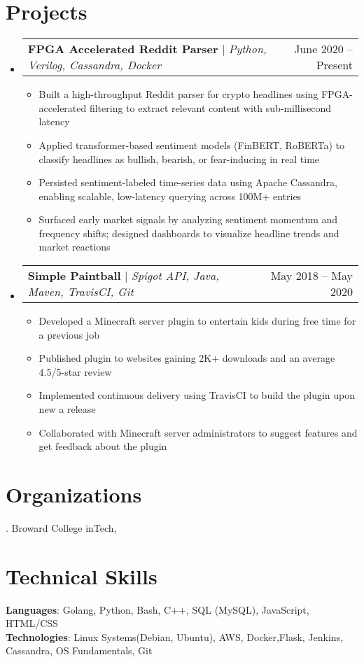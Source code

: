 \documentclass[letterpaper,11pt]{article}
\makeatletter
\newcommand{\resumeItem}[1]{
  \item\small{
    {#1 \vspace{-2pt}}
  }
}
\newcommand{\resumeProjectHeading}[2]{
    \item
    \begin{tabular*}{0.97\textwidth}{l@{\extracolsep{\fill}}r}
      \small#1 & #2 \\
    \end{tabular*}\vspace{-7pt}
}
\newcommand{\resumeSubHeadingListStart}{\begin{itemize}[leftmargin=0.15in, label={}]}
\newcommand{\resumeSubHeadingListEnd}{\end{itemize}}
\newcommand{\resumeItemListStart}{\begin{itemize}}
\newcommand{\resumeItemListEnd}{\end{itemize}\vspace{-5pt}}
\makeatother
\begin{document}
\section{Projects}
    \resumeSubHeadingListStart
\resumeProjectHeading
  {\textbf{FPGA Accelerated Reddit Parser} $|$ \emph{Python, Verilog, Cassandra, Docker}}{June 2020 -- Present}
  \resumeItemListStart
    \resumeItem{Built a high-throughput Reddit parser for crypto headlines using FPGA-accelerated filtering to extract relevant content with sub-millisecond latency}
    \resumeItem{Applied transformer-based sentiment models (FinBERT, RoBERTa) to classify headlines as bullish, bearish, or fear-inducing in real time}
    \resumeItem{Persisted sentiment-labeled time-series data using Apache Cassandra, enabling scalable, low-latency querying across 100M+ entries}
    \resumeItem{Surfaced early market signals by analyzing sentiment momentum and frequency shifts; designed dashboards to visualize headline trends and market reactions}
  \resumeItemListEnd
      \resumeProjectHeading
          {\textbf{Simple Paintball} $|$ \emph{Spigot API, Java, Maven, TravisCI, Git}}{May 2018 -- May 2020}
          \resumeItemListStart
            \resumeItem{Developed a Minecraft server plugin to entertain kids during free time for a previous job}
            \resumeItem{Published plugin to websites gaining 2K+ downloads and an average 4.5/5-star review}
            \resumeItem{Implemented continuous delivery using TravisCI to build the plugin upon new a release}
            \resumeItem{Collaborated with Minecraft server administrators to suggest features and get feedback about the plugin}
          \resumeItemListEnd
    \resumeSubHeadingListEnd
\section{Organizations}
. Broward College inTech, 

%
\section{Technical Skills}
 \begin{itemize}[leftmargin=0.15in, label={}]
    \small{\item{
     \textbf{Languages}{: Golang, Python, Bash, C++, SQL (MySQL), JavaScript, HTML/CSS} \\
     \textbf{Technologies}{: Linux Systems(Debian, Ubuntu), AWS, Docker,Flask, Jenkins, Cassandra, OS Fundamentals, Git} \\ 
    }}
 \end{itemize}


\end{document}
